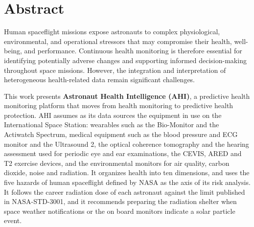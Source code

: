 \section*{Abstract}

Human spaceflight missions expose astronauts to complex physiological, environmental, and operational stressors that may compromise their health, well-being, and performance. Continuous health monitoring is therefore essential for identifying potentially adverse changes and supporting informed decision-making throughout space missions. However, the integration and interpretation of heterogeneous health-related data remain significant challenges.

This work presents \textbf{Astronaut Health Intelligence (AHI)}, a predictive health monitoring platform that moves from health monitoring to predictive health protection. AHI assumes as its data sources the equipment in use on the International Space Station: wearables such as the Bio-Monitor and the Actiwatch Spectrum, medical equipment such as the blood pressure and ECG monitor and the Ultrasound 2, the optical coherence tomography and the hearing assessment used for periodic eye and ear examinations, the CEVIS, ARED and T2 exercise devices, and the environmental monitors for air quality, carbon dioxide, noise and radiation. It organizes health into ten dimensions, and uses the five hazards of human spaceflight defined by NASA as the axis of its risk analysis. It follows the career radiation dose of each astronaut against the limit published in NASA-STD-3001, and it recommends preparing the radiation shelter when space weather notifications or the on board monitors indicate a solar particle event.

